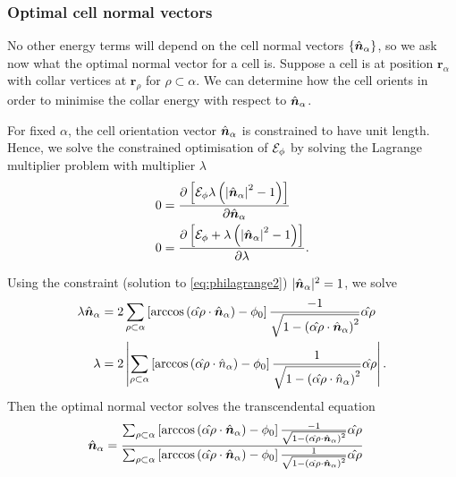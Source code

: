 \subsubsection{Optimal cell normal vectors} \label{subsubsec:opt_norm}

No other energy terms will depend on the cell normal vectors $\{ \hat{\bm{n}}_\alpha \}$, so we ask now what the optimal normal vector for a cell is. Suppose a cell is at position $\bm{r}_\alpha$ with collar vertices at $\bm{r}_\rho$ for $\rho \subset \alpha$. We can determine how the cell orients in order to minimise the collar energy with respect to $\hat{\bm{n}}_\alpha$. 

For fixed $\alpha$, the cell orientation vector $\hat{\bm{n}}_\alpha$ is constrained to have unit length. Hence, we solve the constrained optimisation of $\mathcal{E}_\phi$ by solving the Lagrange multiplier problem with multiplier $\lambda$
\begin{align}
    0 &= \frac{\partial \left[ \mathcal{E}_\phi \lambda\left( \left| \hat{\bm{n}}_\alpha\right|^2 - 1\right) \right] }{\partial \hat{\bm{n}}_\alpha} \label{eq:philagrange1} \\
    0 &= \frac{\partial \left[ \mathcal{E}_\phi + \lambda\left( \left| \hat{\bm{n}}_\alpha\right|^2 - 1\right)\right] }{\partial \lambda}. \label{eq:philagrange2}
\end{align}

Using the constraint (solution to \cref{eq:philagrange2}) $| \hat{\bm{n}}_\alpha |^2 = 1$, we solve 
\begin{align*} 
    \lambda \hat{\bm{n}}_\alpha &= 2 \sum_{\rho\subset\alpha} \left[ \arccos\left(\hat{\alpha\rho} \cdot \hat{\bm{n}}_\alpha \right) - \phi_0 \right] \frac{-1}{\sqrt{1 - \left(\hat{\alpha\rho} \cdot \hat{\bm{n}}_\alpha \right)^2 }} \hat{\alpha\rho} \\
    \lambda &= 2 \left| \sum_{\rho\subset\alpha} \left[ \arccos\left(\hat{\alpha\rho} \cdot \hat{n}_\alpha \right) - \phi_0 \right] \frac{1}{\sqrt{1 - \left(\hat{\alpha\rho} \cdot \hat{n}_\alpha \right)^2 }} \hat{\alpha\rho} \right|.  
\end{align*}
\noindent Then the optimal normal vector solves the transcendental equation 
\begin{align}
    \hat{\bm{n}}_\alpha &= \frac{\sum_{\rho\subset\alpha} \left[ \arccos\left(\hat{\alpha\rho} \cdot \hat{\bm{n}}_\alpha \right) - \phi_0 \right] \frac{-1}{\sqrt{1 - \left(\hat{\alpha\rho} \cdot \hat{\bm{n}}_\alpha \right)^2 }} \hat{\alpha\rho} }{\sum_{\rho\subset\alpha} \left[ \arccos\left(\hat{\alpha\rho} \cdot \hat{\bm{n}}_\alpha \right) - \phi_0 \right] \frac{1}{\sqrt{1 - \left(\hat{\alpha\rho} \cdot \hat{\bm{n}}_\alpha \right)^2 }} \hat{\alpha\rho}} \label{eq:optimal_n}
\end{align}

